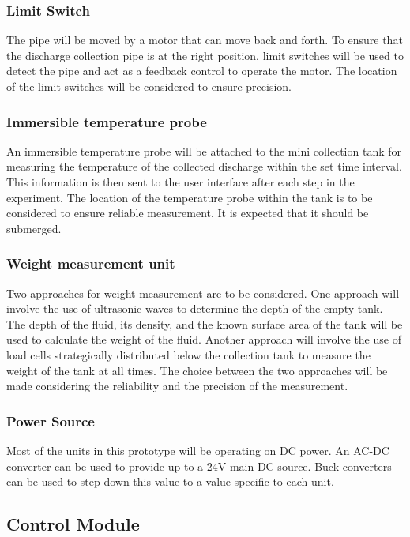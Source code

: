 \subsubsection{Limit Switch}
The pipe will be moved by a motor that can move back and forth. To ensure that the discharge collection pipe is at the right position, limit switches will be used to detect the pipe and act as a feedback control to operate the motor. The location of the limit switches will be considered to ensure precision.

\subsubsection{Immersible temperature probe}
An immersible temperature probe will be attached to the mini collection tank for measuring the temperature of the collected discharge within the set time interval. This information is then sent to the user interface after each step in the experiment. The location of the temperature probe within the tank is to be considered to ensure reliable measurement. It is expected that it should be submerged. 

\subsubsection{Weight measurement unit}

Two approaches for weight measurement are to be considered. One approach will involve the use of ultrasonic waves to determine the depth of the empty tank. The depth of the fluid, its density, and the known surface area of the tank will be used to calculate the weight of the fluid. Another approach will involve the use of load cells strategically distributed below the collection tank to measure the weight of the tank at all times. The choice between the two approaches will be made considering the reliability and the precision of the measurement.

\subsubsection{Power Source}
Most of the units in this prototype will be operating on DC power. An AC-DC converter can be used to provide up to a 24V main DC source. Buck converters can be used to step down this value to a value specific to each unit.

\subsection{Control Module}
